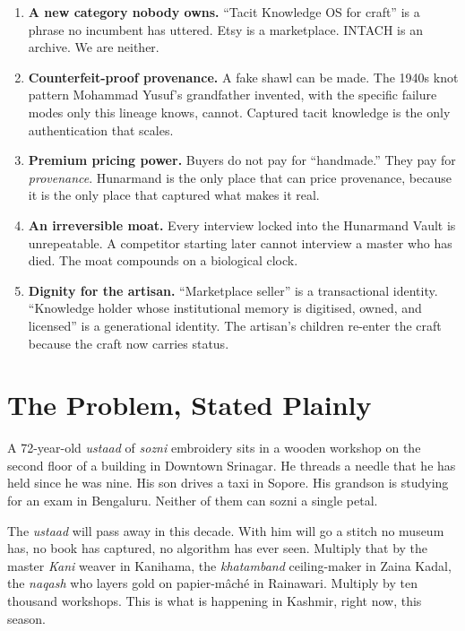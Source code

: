 \documentclass[11pt, a4paper]{article}
\begin{document}
\begin{enumerate}
  \item \textbf{A new category nobody owns.} ``Tacit Knowledge OS for craft'' is a phrase no incumbent has uttered. Etsy is a marketplace. INTACH is an archive. We are neither.
  \item \textbf{Counterfeit-proof provenance.} A fake shawl can be made. The 1940s knot pattern Mohammad Yusuf's grandfather invented, with the specific failure modes only this lineage knows, cannot. Captured tacit knowledge is the only authentication that scales.
  \item \textbf{Premium pricing power.} Buyers do not pay for ``handmade.'' They pay for \textit{provenance}. Hunarmand is the only place that can price provenance, because it is the only place that captured what makes it real.
  \item \textbf{An irreversible moat.} Every interview locked into the Hunarmand Vault is unrepeatable. A competitor starting later cannot interview a master who has died. The moat compounds on a biological clock.
  \item \textbf{Dignity for the artisan.} ``Marketplace seller'' is a transactional identity. ``Knowledge holder whose institutional memory is digitised, owned, and licensed'' is a generational identity. The artisan's children re-enter the craft because the craft now carries status.
\end{enumerate}

\section{The Problem, Stated Plainly}

A 72-year-old {\itshape ustaad} of {\itshape sozni} embroidery sits in a wooden workshop on the second floor of a building in Downtown Srinagar. He threads a needle that he has held since he was nine. His son drives a taxi in Sopore. His grandson is studying for an exam in Bengaluru. Neither of them can sozni a single petal.

The {\itshape ustaad} will pass away in this decade. With him will go a stitch no museum has, no book has captured, no algorithm has ever seen. Multiply that by the master {\itshape Kani} weaver in Kanihama, the {\itshape khatamband} ceiling-maker in Zaina Kadal, the {\itshape naqash} who layers gold on papier-m\^{a}ch\'{e} in Rainawari. Multiply by ten thousand workshops. This is what is happening in Kashmir, right now, this season.
\end{document}
